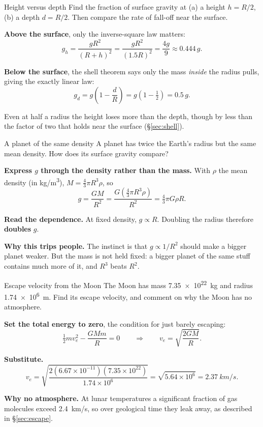 \begin{exbox}{Height versus depth}
Find the fraction of surface gravity at (a) a height $h=R/2$, (b) a depth $d=R/2$. Then compare the
rate of fall-off near the surface.

 \textbf{Above the surface}, only the inverse-square law matters:
\[
g_h=\frac{gR^{2}}{(R+h)^{2}}=\frac{gR^{2}}{(1.5R)^{2}}=\frac{4g}{9}\approx0.444\,g .
\]

 \textbf{Below the surface}, the shell theorem says only the mass \emph{inside} the radius
pulls, giving the exactly linear law:
\[
g_d=g\left(1-\frac{d}{R}\right)=g\left(1-\tfrac{1}{2}\right)=0.5\,g .
\]

Even at half a radius the height loses more than the depth, though by less than the factor of two that
holds near the surface (\S\ref{sec:shell}).
\end{exbox}

\begin{exbox}{A planet of the same density}
A planet has twice the Earth's radius but the same mean density. How does its surface gravity compare?

 \textbf{Express $g$ through the density rather than the mass.} With $\rho$ the mean
density (in \si{kg/m^3}), $M=\tfrac{4}{3}\pi R^{3}\rho$, so
\[
g=\frac{GM}{R^{2}}=\frac{G\left(\tfrac{4}{3}\pi R^{3}\rho\right)}{R^{2}}=\tfrac{4}{3}\pi G\rho R .
\]

 \textbf{Read the dependence.} At fixed density, $g\propto R$. Doubling the radius therefore
\textbf{doubles} $g$.

\smallskip
\textbf{Why this trips people.} The instinct is that $g\propto1/R^{2}$ should make a bigger planet
weaker. But the mass is not held fixed: a bigger planet of the same stuff contains much more of it,
and $R^{3}$ beats $R^{2}$.
\end{exbox}

\begin{exbox}{Escape velocity from the Moon}
The Moon has mass \SI{7.35e22}{kg} and radius \SI{1.74e6}{m}. Find its escape velocity, and comment on
why the Moon has no atmosphere.

 \textbf{Set the total energy to zero}, the condition for just barely escaping:
\[
\tfrac{1}{2}mv_e^{2}-\frac{GMm}{R}=0
\qquad\Longrightarrow\qquad
v_e=\sqrt{\frac{2GM}{R}} .
\]

 \textbf{Substitute.}
\[
v_e=\sqrt{\frac{2(6.67\times10^{-11})(7.35\times10^{22})}{1.74\times10^{6}}}
=\sqrt{5.64\times10^{6}}=\SI{2.37}{km/s}.
\]

 \textbf{Why no atmosphere.} At lunar temperatures a significant fraction of gas molecules
exceed \SI{2.4}{km/s}, so over geological time they leak away, as described in \S\ref{sec:escape}. 
\end{exbox}

